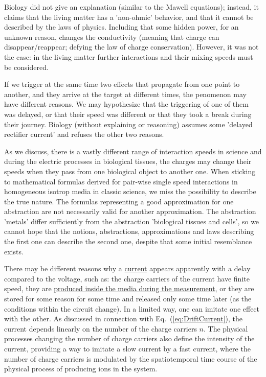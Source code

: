 Biology did not give an explanation (similar to the Mawell equations); instead,
it claims that the living matter has a  'non-ohmic' behavior,
and that it cannot be described by the laws of physics.
Including that some hidden power, for an unknown reason, changes the conductivity
(meaning that charge can disappear/reappear; defying the law of charge conservation).
However, it was not the case: in the living matter further interactions
and their mixing speeds must be considered.


If we trigger at the same time two effects that propagate from one point to another,
and they arrive at the target at different times, the penomenon may have different reasons.
We may hypothesize that the triggering of one of them was delayed,
or that their speed was different or that they took a break during their journey. 
Biology (without explaining or reasoning) assumes some 'delayed rectifier current'
and refuses the other two reasons.

As we discuss, there is a vastly different range of interaction speeds in science
and during the electric processes in biological tissues,
the charges may change their speeds
when they pass from one biological object to another one.
When sticking to mathematical formulas derived for pair-wise single speed interactions
in homogeneous isotrop media in classic science, we miss the possibility to 
describe the true nature. The formulas representing a good
{approximation for one abstraction}
are not necessarily valid for another approximation.
The abstraction 'metals' differ sufficiently from the abstraction 'biological tissues and cells',
so we cannot hope that the notions, abstractions, approximations and laws describing
the first one can describe the second one, despite that some initial resemblance exists.

There may be different reasons why a \hyperlink{electric_current}
{current} appears
apparently with a delay compared to the voltage,
such as: the charge carriers of the current have finite speed,
they are \hyperlink{electric_conductance}
{produced inside the media during the measurement},
or they are stored for some reason for some time
and released only some time later (as the conditions within the circuit change).
In a limited way, one can imitate one effect with the other.
As discussed in connection with Eq.~(\ref{eq:DriftCurrent}),
the current depends linearly on the number of the charge carriers $n$.
The physical processes changing the number of charge carriers
also define the intensity of the current, providing a way to imitate
a slow current by a fast current, where  the number of charge carriers is modulated by the spatiotemporal time course of the physical process of producing ions in the system.

